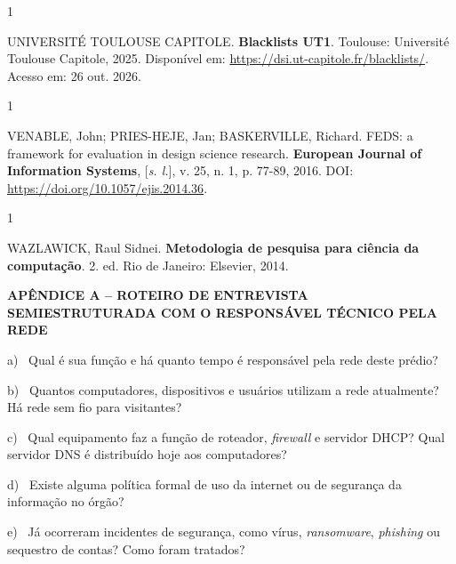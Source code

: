 \documentclass[12pt,a4paper]{article}
\begin{document}
\begin{spacing}{1}\raggedright\noindent UNIVERSITÉ TOULOUSE CAPITOLE. \textbf{Blacklists UT1}. Toulouse: Université Toulouse Capitole, 2025. Disponível em: \url{https://dsi.ut-capitole.fr/blacklists/}. Acesso em: 26 out. 2026.\par\vspace{12pt}\end{spacing}
\begin{spacing}{1}\raggedright\noindent VENABLE, John; PRIES-HEJE, Jan; BASKERVILLE, Richard. FEDS: a framework for evaluation in design science research. \textbf{European Journal of Information Systems}, [\textit{s. l.}], v. 25, n. 1, p. 77-89, 2016. DOI: \url{https://doi.org/10.1057/ejis.2014.36}.\par\vspace{12pt}\end{spacing}
\begin{spacing}{1}\raggedright\noindent WAZLAWICK, Raul Sidnei. \textbf{Metodologia de pesquisa para ciência da computação}. 2. ed. Rio de Janeiro: Elsevier, 2014.\par\vspace{12pt}\end{spacing}
\clearpage
\begin{center}\textbf{APÊNDICE A – ROTEIRO DE ENTREVISTA SEMIESTRUTURADA COM O RESPONSÁVEL TÉCNICO PELA REDE}\end{center}
\vspace{6pt}
{\leftskip=1.25cm\noindent\hangindent=0.6cm a)~ Qual é sua função e há quanto tempo é responsável pela rede deste prédio?\par}
{\leftskip=1.25cm\noindent\hangindent=0.6cm b)~ Quantos computadores, dispositivos e usuários utilizam a rede atualmente? Há rede sem fio para visitantes?\par}
{\leftskip=1.25cm\noindent\hangindent=0.6cm c)~ Qual equipamento faz a função de roteador, \textit{firewall} e servidor DHCP? Qual servidor DNS é distribuído hoje aos computadores?\par}
{\leftskip=1.25cm\noindent\hangindent=0.6cm d)~ Existe alguma política formal de uso da internet ou de segurança da informação no órgão?\par}
{\leftskip=1.25cm\noindent\hangindent=0.6cm e)~ Já ocorreram incidentes de segurança, como vírus, \textit{ransomware}, \textit{phishing} ou sequestro de contas? Como foram tratados?\par}
\end{document}
